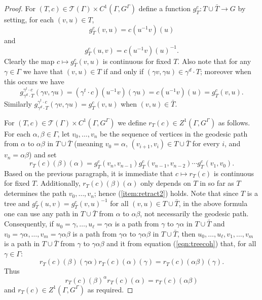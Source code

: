 \documentclass[12pt]{amsart}
\theoremstyle{definition}
\def\cal{\mathcal}
\begin{document}
\begin{proof}
	For $(T, c) \in \cal T(\Gamma) \times C^1(\Gamma, G^\Gamma)$ define a function $g_T^c : T \cup \bar T \rightarrow G$ by setting, for each $(v, u) \in T$,
	\[g_T^c(v, u) = c(u^{-1} v)(u)\]
	and
	\[g_T^c(u,v) = c(u^{-1} v)(u)^{-1}.\]
	Clearly the map $c \mapsto g_T^c(v, u)$ is continuous for fixed $T$. Also note that for any $\gamma \in \Gamma$ we have that $(v, u) \in T$ if and only if $(\gamma v, \gamma u) \in \gamma^d \cdot T$; moreover when this occurs we have
	\[g_{\gamma^d \cdot T}^{\gamma^t \cdot c}(\gamma v, \gamma u) = (\gamma^t \cdot c)(u^{-1} v)(\gamma u) = c(u^{-1} v)(u) = g_T^c(v, u).\]
	Similarly $g_{\gamma^d \cdot T}^{\gamma^t \cdot c}(\gamma v, \gamma u) = g_T^c(v, u)$ when $(v, u) \in \bar T$.
	
	For $(T,c) \in \cal T(\Gamma) \times C^1(\Gamma, G^\Gamma)$ we define $r_T(c) \in Z^1(\Gamma, G^\Gamma)$ as follows. For each $\alpha, \beta \in \Gamma$, let $v_0, \ldots, v_n$ be the sequence of vertices in the geodesic path from $\alpha$ to $\alpha \beta$ in $T \cup \bar T$ (meaning $v_0 = \alpha$, $(v_{i+1}, v_i) \in T \cup \bar T$ for every $i$, and $v_n = \alpha \beta$) and set
	\begin{equation} \label{eqn:treecoh}
		r_T(c)(\beta)(\alpha) = g_T^c(v_n, v_{n-1}) g_T^c(v_{n-1}, v_{n-2}) \cdots g_T^c(v_1, v_0).
	\end{equation}
	Based on the previous paragraph, it is immediate that $c \mapsto r_T(c)$ is continuous for fixed $T$. Additionally, $r_T(c)(\beta)(\alpha)$ only depends on $T$ in so far as $T$ determines the path $v_0, \ldots, v_n$; hence (\ref{item:retract2}) holds. Note that since $T$ is a tree and $g_T^c(u,v) = g_T^c(v,u)^{-1}$ for all $(v,u) \in T \cup \bar T$, in the above formula one can use any path in $T \cup \bar T$ from $\alpha$ to $\alpha \beta$, not necessarily the geodesic path. Consequently, if $u_0 = \gamma, \ldots, u_\ell = \gamma \alpha$ is a path from $\gamma$ to $\gamma \alpha$ in $T \cup \bar T$ and $v_0 = \gamma \alpha, \ldots, v_m = \gamma \alpha \beta$ is a path from $\gamma \alpha$ to $\gamma \alpha \beta$ in $T \cup \bar T$, then $u_0, \ldots, u_\ell, v_1, \ldots, v_m$ is a path in $T \cup \bar T$ from $\gamma$ to $\gamma \alpha \beta$ and it from equation (\ref{eqn:treecoh}) that, for all $\gamma\in \Gamma$:
	\[r_T(c)(\beta)(\gamma \alpha) r_T(c)(\alpha)(\gamma) = r_T(c)(\alpha \beta)(\gamma).\]
	Thus
	\[r_T(c)(\beta)^\alpha r_T(c)(\alpha) = r_T(c)(\alpha \beta)\]
	and $r_T(c) \in Z^1(\Gamma, G^\Gamma)$ as required.
	

\end{proof}
\end{document}
